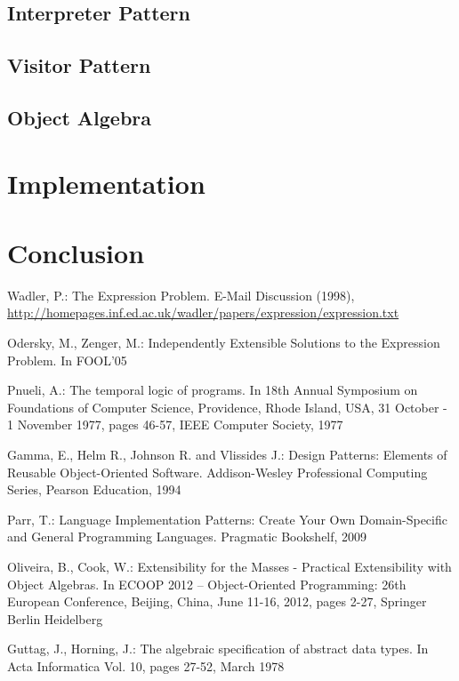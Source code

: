 \documentclass{llncs}
\begin{document}
\subsection{Interpreter Pattern} \label{ssec:interpreter}

\subsection{Visitor Pattern} \label{ssec:visitor}

\subsection{Object Algebra} \label{ssec:oa}

\section{Implementation} \label{sec:oa-ltl}

\section{Conclusion} \label{sec:conclusion}


%
%
\begin{thebibliography}{5}
%

Wadler, P.:
The Expression Problem.
E-Mail Discussion (1998),
\url{http://homepages.inf.ed.ac.uk/wadler/papers/expression/expression.txt}

Odersky, M., Zenger, M.:
Independently Extensible Solutions to the Expression Problem. 
In FOOL'05

Pnueli, A.:
The temporal logic of programs.
In 18th Annual Symposium on Foundations of Computer Science, Providence, Rhode Island, USA, 31 October - 1 November 1977, pages 46-57, IEEE Computer Society, 1977

Gamma, E., Helm R., Johnson R. and Vlissides J.:
Design Patterns: Elements of Reusable Object-Oriented Software.
Addison-Wesley Professional Computing Series, Pearson Education, 1994

Parr, T.:
Language Implementation Patterns: Create Your Own Domain-Specific and General Programming Languages.
Pragmatic Bookshelf, 2009

Oliveira, B., Cook, W.:
Extensibility for the Masses - Practical Extensibility with Object Algebras.
In ECOOP 2012 -- Object-Oriented Programming: 26th European Conference, Beijing, China, June 11-16, 2012, pages 2-27, Springer Berlin Heidelberg

Guttag, J., Horning, J.:
The algebraic specification of abstract data types.
In Acta Informatica Vol. 10, pages 27-52, March 1978

\end{thebibliography}
\end{document}
